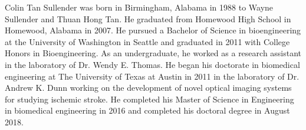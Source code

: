 \documentclass[12pt]{report}
\begin{document}
\begin{vita}
Colin Tan Sullender was born in Birmingham, Alabama in 1988 to Wayne Sullender and Thuan Hong Tan. He graduated from Homewood High School in Homewood, Alabama in 2007. He pursued a Bachelor of Science in bioengineering at the University of Washington in Seattle and graduated in 2011 with College Honors in Bioengineering. As an undergraduate, he worked as a research assistant in the laboratory of Dr. Wendy E. Thomas. He began his doctorate in biomedical engineering at The University of Texas at Austin in 2011 in the laboratory of Dr. Andrew K. Dunn working on the development of novel optical imaging systems for studying ischemic stroke. He completed his Master of Science in Engineering in biomedical engineering in 2016 and completed his doctoral degree in August 2018.
\end{vita}


\end{document}
